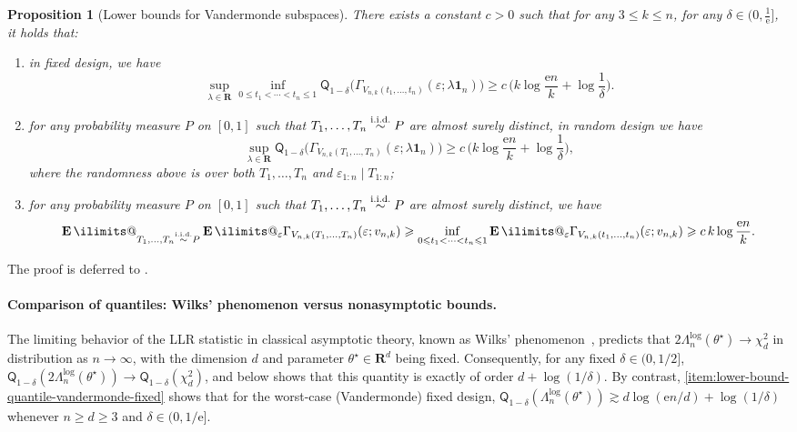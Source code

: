 \documentclass[11pt, letterpaper, hidelinks]{article}
\makeatletter
\newcommand{\R}{\mathbf R}
\newcommand{\e}{\mathrm{e}}
\newcommand{\1}{\mathbf 1}
\newcommand{\eps}{\varepsilon}
\renewcommand{\leq}{\leqslant}
\renewcommand{\geq}{\geqslant}
\newcommand{\iid}{\textnormal{i.i.d.}}
\newcommand{\simiid}{\stackrel{\iid}{\sim}}
\newcommand{\E}{\operatorname*{\mathbf{E}}\ilimits@}
\theoremstyle{plain}
\newtheorem{proposition}{Proposition}[section]
\theoremstyle{definition}
\newcommand{\thetastar}{\theta^\star}
\newcommand{\Quant}[1]{\mathsf{Q}_{#1}}
\makeatother
\begin{document}
\begin{proposition}
[Lower bounds for Vandermonde subspaces]
\label{prop:strong-lower-bound-vandermonde}
There exists a constant $c > 0$ such that 
for any $3 \leq k \leq n$, for any $\delta \in (0, \tfrac{1}{\e}]$, it holds that: 
\begin{enumerate}[label=(\roman*)]
\item \label{item:lower-bound-quantile-vandermonde-fixed}
in fixed design, we have 
\[
\sup_{\lambda \in \R} \inf_{0 \leq t_1 < \cdots < t_n \leq 1} \Quant{1-\delta}\Big(\Gamma_{V_{n,k}(t_1, \dots, t_n)}(\eps; \lambda \1_n)\Big)
\geq c \,\Big(k \log \frac{\e n}{k} + \log \frac{1}{\delta}\Big).
\]
\item \label{item:lower-bound-quantile-vandermonde-random}
for any probability measure $P$ on $[0,1]$ such that
$T_1, \dots, T_n \simiid P$ are almost surely distinct, in random design we have
\[
\sup_{\lambda \in \R} \Quant{1-\delta}\Big(\Gamma_{V_{n,k}(T_1, \dots, T_n)}(\eps; \lambda \1_n)\Big)
\geq c \,\Big(k \log \frac{\e n}{k} + \log \frac{1}{\delta}\Big),
\] 
where the randomness above is over both $T_1,\dots, T_n$ and $\eps_{1:n} \mid T_{1:n}$; 
\item \label{item:lower-bound-expected-vandermonde}
for any probability measure $P$ on $[0,1]$ such that
$T_1, \dots, T_n \simiid P$ are almost surely distinct, we have
\[
\E_{T_1,\dots,T_n \simiid P} \E_\eps \Gamma_{ V_{n,k}(T_1, \dots, T_n)}(\eps; v_{n,k})
\geq 
\inf_{0 \leq t_1 < \cdots < t_n \leq 1} 
\E_\eps \Gamma_{V_{n,k}(t_1, \dots, t_n)}(\eps; v_{n,k})
\geq c \, k \log \frac{\e n}{k}.
\]
\end{enumerate} 
\end{proposition}

The proof is deferred to .

\paragraph{Comparison of quantiles: Wilks' phenomenon versus nonasymptotic bounds.}


The limiting behavior of the LLR statistic in classical asymptotic theory,  known as Wilks' phenomenon~\cite{wilks1938large,chernoff1954likelihood},
predicts that $2\Lambda_n^{\log}(\thetastar) \to \chi^2_d$ in distribution as $n \to \infty$, with the dimension $d$ and parameter $\thetastar \in \R^{d}$ being fixed. Consequently, for any fixed $\delta \in (0,1/2]$, $\Quant{1-\delta}(2\Lambda_n^{\log}(\thetastar)) \to \Quant{1-\delta}(\chi^2_d)$, and  below shows that this quantity is exactly of order $d + \log(1/\delta)$.
By contrast, \ref{item:lower-bound-quantile-vandermonde-fixed} shows that for the worst-case (Vandermonde) fixed design, $\Quant{1-\delta}(\Lambda_n^{\log}(\thetastar)) \gtrsim d\log(\e n/d) + \log(1/\delta)$ whenever $n\geq d\geq3$ and $\delta\in(0,1/\e]$. 
\end{document}

